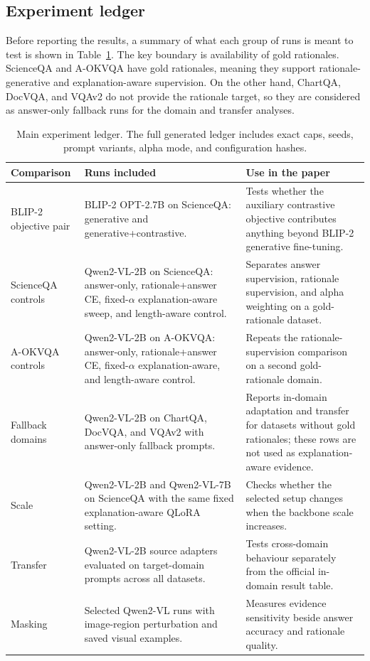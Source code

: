 \documentclass[preprint,12pt]{elsarticle}
\begin{document}
\subsection{Experiment ledger}
Before reporting the results, a summary of what each group of runs is meant to test is shown in Table~\ref{tab:ExperimentLedger}.
The key boundary is availability of gold rationales.
ScienceQA and A-OKVQA have gold rationales, meaning they support rationale-generative and explanation-aware supervision.
On the other hand, ChartQA, DocVQA, and VQAv2 do not provide the rationale target, so they are considered as answer-only fallback runs for the domain and transfer analyses.

\begin{table}[!ht]
\centering
\caption{Main experiment ledger. The full generated ledger includes exact caps, seeds, prompt variants, alpha mode, and configuration hashes.}
\label{tab:ExperimentLedger}
\small
\renewcommand{\arraystretch}{1.15}
\begin{tabular}{|>{\raggedright\arraybackslash}p{}|>{\raggedright\arraybackslash}p{}|>{\raggedright\arraybackslash}p{}|}
\hline
\textbf{Comparison} & \textbf{Runs included} & \textbf{Use in the paper} \\ \hline
BLIP-2 objective pair & BLIP-2 OPT-2.7B on ScienceQA: generative and generative+contrastive. & Tests whether the auxiliary contrastive objective contributes anything beyond BLIP-2 generative fine-tuning. \\
ScienceQA controls & Qwen2-VL-2B on ScienceQA: answer-only, rationale+answer CE, fixed-$\alpha$ explanation-aware sweep, and length-aware control. & Separates answer supervision, rationale supervision, and alpha weighting on a gold-rationale dataset. \\
A-OKVQA controls & Qwen2-VL-2B on A-OKVQA: answer-only, rationale+answer CE, fixed-$\alpha$ explanation-aware, and length-aware control. & Repeats the rationale-supervision comparison on a second gold-rationale domain. \\
Fallback domains & Qwen2-VL-2B on ChartQA, DocVQA, and VQAv2 with answer-only fallback prompts. & Reports in-domain adaptation and transfer for datasets without gold rationales; these rows are not used as explanation-aware evidence. \\
Scale & Qwen2-VL-2B and Qwen2-VL-7B on ScienceQA with the same fixed explanation-aware QLoRA setting. & Checks whether the selected setup changes when the backbone scale increases. \\
Transfer & Qwen2-VL-2B source adapters evaluated on target-domain prompts across all datasets. & Tests cross-domain behaviour separately from the official in-domain result table. \\
Masking & Selected Qwen2-VL runs with image-region perturbation and saved visual examples. & Measures evidence sensitivity beside answer accuracy and rationale quality. \\ \hline
\end{tabular}
\end{table}
\end{document}

